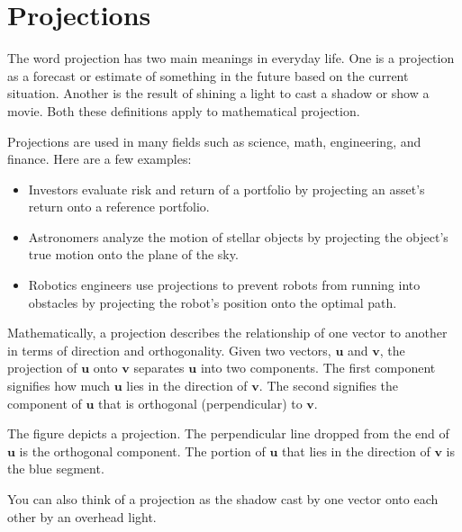 \chapter{Projections}

The word projection has two main meanings in everyday life. One is a projection as a forecast or estimate of something in the future based on the current situation. Another is the result of shining a light to cast a shadow or show a movie. Both these definitions apply to mathematical projection.

Projections are used in many fields such as science, math, engineering, and finance. Here are a few examples: 
\begin{itemize}
\item Investors evaluate risk and return of a portfolio by projecting an asset’s return onto a reference portfolio.
\item Astronomers analyze the motion of stellar objects by projecting the object’s true motion onto the plane of the sky.
\item Robotics engineers use projections to prevent robots from running into obstacles by projecting the robot’s position onto the optimal path.
\end{itemize}

Mathematically, a projection describes the relationship of one vector to another in terms of direction and orthogonality. Given two vectors, $\mathbf{u}$ and $\mathbf{v}$, the projection of $\mathbf{u}$ onto $\mathbf{v}$ separates $\mathbf{u}$ into two components. The first component signifies how much $\mathbf{u}$ lies in the direction of $\mathbf{v}$. The second signifies the component of $\mathbf{u}$ that is orthogonal (perpendicular) to $\mathbf{v}$.  

The figure depicts a projection. The perpendicular line dropped from the end of $\mathbf{u}$ is the orthogonal component. The portion of $\mathbf{u}$ that lies in the direction of $\mathbf{v}$ is the blue segment. 


You can also think of a projection as the shadow cast by one vector onto each other by an overhead light.

